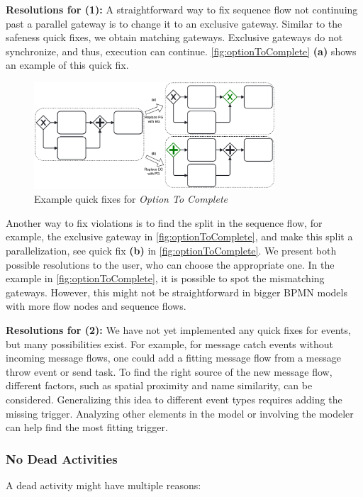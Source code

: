 \documentclass[runningheads]{llncs}
\begin{document}
\textbf{Resolutions for (1):} A straightforward way to fix sequence flow not continuing past a parallel gateway is to change it to an exclusive gateway.
Similar to the safeness quick fixes, we obtain matching gateways.
Exclusive gateways do not synchronize, and thus, execution can continue.
\autoref{fig:optionToComplete} \textbf{(a)} shows an example of this quick fix.

\begin{figure}[ht]
	\centering
	\includegraphics[width=0.8\textwidth]{images/optionToComplete}
	\caption{Example quick fixes for \textit{Option To Complete}}
	\label{fig:optionToComplete}
\end{figure}

Another way to fix violations is to find the split in the sequence flow, for example, the exclusive gateway in \autoref{fig:optionToComplete}, and make this split a parallelization, see quick fix \textbf{(b)} in \autoref{fig:optionToComplete}.
We present both possible resolutions to the user, who can choose the appropriate one.
In the example in \autoref{fig:optionToComplete}, it is possible to spot the mismatching gateways.
However, this might not be straightforward in bigger BPMN models with more flow nodes and sequence flows.

\textbf{Resolutions for (2):} We have not yet implemented any quick fixes for events, but many possibilities exist.
For example, for message catch events without incoming message flows, one could add a fitting message flow from a message throw event or send task.
To find the right source of the new message flow, different factors, such as spatial proximity and name similarity, can be considered.
Generalizing this idea to different event types requires adding the missing trigger.
Analyzing other elements in the model or involving the modeler can help find the most fitting trigger.

\subsubsection{No Dead Activities}
A dead activity might have multiple reasons:
\end{document}
